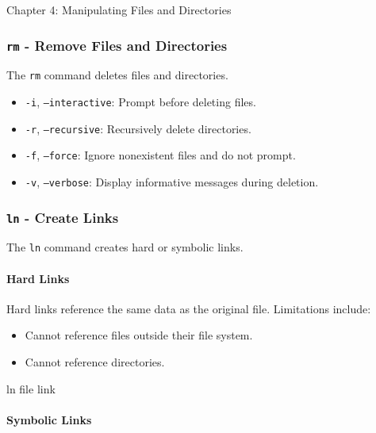 \begin{notes}{Chapter 4: Manipulating Files and Directories}
    \subsubsection*{\texttt{rm} - Remove Files and Directories}

    The \texttt{rm} command deletes files and directories.

    \begin{highlight}
    \begin{itemize}
        \item \texttt{-i}, \texttt{--interactive}: Prompt before deleting files.
        \item \texttt{-r}, \texttt{--recursive}: Recursively delete directories.
        \item \texttt{-f}, \texttt{--force}: Ignore nonexistent files and do not prompt.
        \item \texttt{-v}, \texttt{--verbose}: Display informative messages during deletion.
    \end{itemize}
    \end{highlight}

    \subsubsection*{\texttt{ln} - Create Links}

    The \texttt{ln} command creates hard or symbolic links.

    \paragraph*{Hard Links}

    Hard links reference the same data as the original file. Limitations include:
    \begin{itemize}
        \item Cannot reference files outside their file system.
        \item Cannot reference directories.
    \end{itemize}

    \begin{highlight}
    \begin{code}[Pseudo]
    ln file link
    \end{code}
    \end{highlight}

    \paragraph*{Symbolic Links}


\end{notes}
